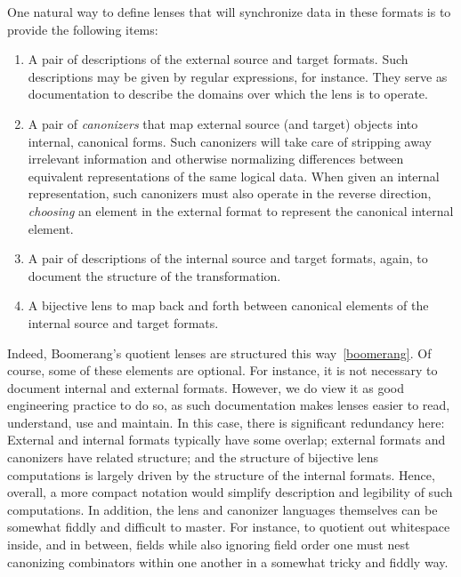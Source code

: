 \documentclass[acmsmall,review,anonymous]{acmart}\settopmatter{printfolios=true,printccs=false,printacmref=false}
\begin{document}
One natural way to define lenses that will synchronize data in these formats
is to provide the following items:

\begin{enumerate}
\item A pair of descriptions of the external source and target formats.
Such descriptions may be given by regular expressions, for instance.
They serve as documentation to describe the domains over which the lens
is to operate.
\item A pair of \emph{canonizers} that map external source (and target)
objects into internal, canonical forms.  Such canonizers will take
care of stripping away irrelevant information and otherwise normalizing
differences between equivalent representations of the same logical data.
When given an internal representation, such canonizers must also operate
in the reverse direction, \emph{choosing} an element in the external format
to represent the canonical internal element.
\item A pair of descriptions of the internal source and
target formats, again, to document the structure of the transformation.
\item A bijective lens to map back and forth between canonical elements
of the internal source and target formats.
\end{enumerate}

\noindent
Indeed, Boomerang's quotient lenses are structured this way~\ref{boomerang}.
Of course, some of these elements are optional.  For instance, it is
not necessary to document internal and external formats.  However, we do
view it as good engineering practice to do so, as such documentation makes
lenses easier to read, understand, use and maintain.  In this case, there is
significant redundancy here:  External and internal formats
typically have some overlap; external formats and canonizers have related
structure; and the structure of bijective lens computations is largely driven
by the structure of the internal formats.  Hence, overall, a more compact
notation would simplify description and legibility of such computations.
In addition,
the lens and canonizer languages themselves can be somewhat fiddly and
difficult to
master.  For instance, to quotient out whitespace inside, and in between,
fields while also ignoring field order one must nest canonizing combinators
within one another in a somewhat tricky and fiddly way.  
\end{document}
